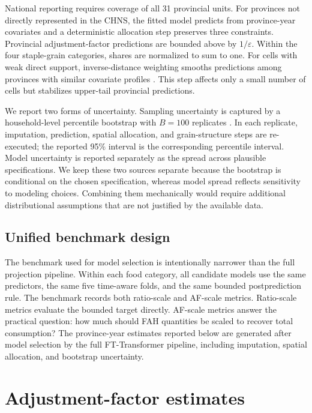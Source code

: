 \documentclass[preprint,12pt,authoryear]{elsarticle}
\begin{document}
National reporting requires coverage of all 31 provincial units. For provinces not directly represented in the CHNS, the fitted model predicts from province-year covariates and a deterministic allocation step preserves three constraints. Provincial adjustment-factor predictions are bounded above by $1/\varepsilon$. Within the four staple-grain categories, shares are normalized to sum to one. For cells with weak direct support, inverse-distance weighting smooths predictions among provinces with similar covariate profiles \citep{Shepard1968}. This step affects only a small number of cells but stabilizes upper-tail provincial predictions.

We report two forms of uncertainty. Sampling uncertainty is captured by a household-level percentile bootstrap with $B=100$ replicates \citep{Efron1993}. In each replicate, imputation, prediction, spatial allocation, and grain-structure steps are re-executed; the reported 95\% interval is the corresponding percentile interval. Model uncertainty is reported separately as the spread across plausible specifications. We keep these two sources separate because the bootstrap is conditional on the chosen specification, whereas model spread reflects sensitivity to modeling choices. Combining them mechanically would require additional distributional assumptions that are not justified by the available data.

\subsection{Unified benchmark design}

The benchmark used for model selection is intentionally narrower than the full projection pipeline. Within each food category, all candidate models use the same predictors, the same five time-aware folds, and the same bounded postprediction rule. The benchmark records both ratio-scale and AF-scale metrics. Ratio-scale metrics evaluate the bounded target directly. AF-scale metrics answer the practical question: how much should FAH quantities be scaled to recover total consumption? The province-year estimates reported below are generated after model selection by the full FT-Transformer pipeline, including imputation, spatial allocation, and bootstrap uncertainty.

\section{Adjustment-factor estimates}
\label{sec:results}
\end{document}
